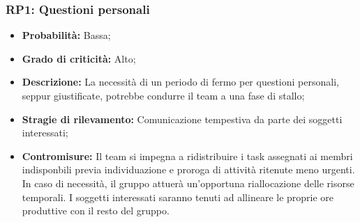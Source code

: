 \subsubsection{RP1: Questioni personali}
\begin{itemize}
    \item \textbf{Probabilità:} Bassa;
    \item \textbf{Grado di criticità:} Alto;
    \item \textbf{Descrizione:} La necessità di un periodo di fermo per questioni personali, seppur giustificate, potrebbe condurre il team a una fase di stallo;
    \item \textbf{Stragie di rilevamento:} Comunicazione tempestiva da parte dei soggetti interessati;
    \item \textbf{Contromisure:} Il team si impegna a ridistribuire i task assegnati ai membri indisponbili previa individuazione e proroga di attività ritenute meno urgenti. In caso di necessità, il gruppo attuerà un'opportuna riallocazione delle risorse temporali. I soggetti interessati saranno tenuti ad allineare le proprie ore produttive con il resto del gruppo.
\end{itemize}